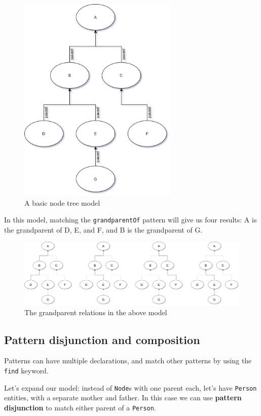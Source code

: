 \documentclass[11pt,a4paper,oneside]{report}
\begin{document}
\begin{figure}[!htbp]
\centering
\includegraphics[height=100mm, keepaspectratio]{figures/basic-eval-explanation-1.png}
\caption{A basic node tree model}
\label{fig:basic-eval-explanation-1}
\end{figure}

\pagebreak
In this model, matching the \texttt{grandparentOf} pattern will give us four
results: A is the grandparent of D, E, and F, and B is the grandparent of G.

\begin{figure}[!htbp]
\centering
\includegraphics[width=150mm, keepaspectratio]{figures/basic-eval-explanation-2.png}
\caption{The grandparent relations in the above model}
\label{fig:basic-eval-explanation-2}
\end{figure}

\subsection{Pattern disjunction and composition}
Patterns can have multiple declarations, and match other patterns by using the
\texttt{find} keyword.

Let's expand our model: instead of \texttt{Node}s with one parent each, let's
have \texttt{Person} entities, with a separate mother and father. In this case
we can use \textbf{pattern disjunction} to match either parent of a
\texttt{Person}.
\end{document}
